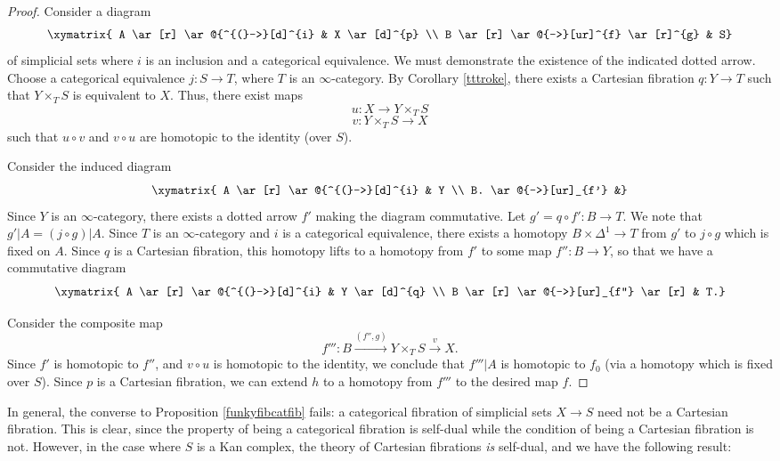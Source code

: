 \begin{proof}
Consider a diagram
$$ \xymatrix{ A \ar[r] \ar@{^{(}->}[d]^{i} & X \ar[d]^{p} \\
B \ar[r] \ar@{-->}[ur]^{f} \ar[r]^{g}  & S} $$
of simplicial sets where $i$ is an inclusion and a categorical equivalence. We must demonstrate the existence of the indicated dotted arrow. Choose a categorical equivalence
$j: S \rightarrow T$, where $T$ is an $\infty$-category. By Corollary \ref{tttroke}, there exists
a Cartesian fibration $q: Y \rightarrow T$
such that $Y \times_{T} S$ is equivalent to $X$. Thus, there exist maps $$ u: X \rightarrow Y \times_{T} S $$
$$ v: Y \times_{T} S \rightarrow X$$
such that $u \circ v$ and $v \circ u$ are homotopic to the identity (over $S$).

Consider the induced diagram
$$ \xymatrix{ A \ar[r] \ar@{^{(}->}[d]^{i} & Y \\
B. \ar@{-->}[ur]_{f'} &} $$
Since $Y$ is an $\infty$-category, there exists a dotted arrow $f'$ making the diagram commutative. Let $g' = q \circ f': B \rightarrow T$. We note that $g'|A = (j \circ g)|A$. Since $T$ is an $\infty$-category and $i$ is a categorical equivalence, there exists a homotopy
$B \times \Delta^1 \rightarrow T$ from $g'$ to $j \circ g$ which is fixed on $A$. Since
$q$ is a Cartesian fibration, this homotopy lifts to a homotopy from $f'$ to some map
$f'': B \rightarrow Y$, so that we have a commutative diagram 
$$ \xymatrix{ A \ar[r] \ar@{^{(}->}[d]^{i} & Y \ar[d]^{q} \\
B \ar[r] \ar@{-->}[ur]_{f''} \ar[r] & T.} $$

Consider the composite map
$$ f''': B \stackrel{(f'',g)}{\rightarrow} Y \times_{T} S \stackrel{v}{\rightarrow} X.$$
Since $f'$ is homotopic to $f''$, and $v \circ u$ is homotopic to the identity, we conclude that
$f'''|A$ is homotopic to $f_0$ (via a homotopy which is fixed over $S$). Since $p$ is a Cartesian fibration, we can extend $h$ to a homotopy from $f'''$ to the desired map $f$.
\end{proof}

In general, the converse to Proposition \ref{funkyfibcatfib} fails: a categorical fibration of simplicial sets $X \rightarrow S$ need not be a Cartesian fibration. This is clear, since the property of being a categorical fibration is self-dual while the condition of being a Cartesian fibration is not. However, in the case where $S$ is a Kan complex, the theory of Cartesian fibrations {\em is} self-dual, and we have the following result:

